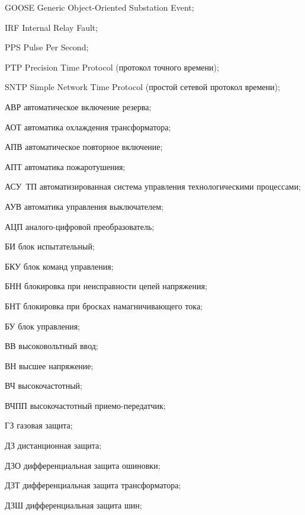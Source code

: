 \begin{list}{}%
{%
  \setlength{\labelwidth}{\abbrwidth}%
  \setlength{\labelsep}{0pt}%
  \setlength{\leftmargin}{\dimexpr\labelwidth+\labelsep\relax}%
  \setlength{\itemindent}{0pt}%
  \setlength{\parsep}{0pt}%
  \setlength{\itemsep}{0pt}
  \renewcommand{\makelabel}[1]{#1 --\hspace{\abbrgap}}%
}
\item[GOOSE] Generic Object-Oriented Substation Event;
\item[IRF] Internal Relay Fault;
\item[PPS] Pulse Per Second;
\item[PTP] Precision Time Protocol (протокол точного времени);
\item[SNTP] Simple Network Time Protocol (простой сетевой протокол времени);
\item[АВР] автоматическое включение резерва;
\item[АОТ] автоматика охлаждения трансформатора;
\item[АПВ] автоматическое повторное включение;
\item[АПТ] автоматика пожаротушения;
\item[АСУ~ТП] автоматизированная система управления технологическими процессами;
\item[АУВ] автоматика управления выключателем;
\item[АЦП] аналого-цифровой преобразователь;
\item[БИ] блок испытательный;
\item[БКУ] блок команд управления;
\item[БНН] блокировка при неисправности цепей напряжения;
\item[БНТ] блокировка при бросках намагничивающего тока;
\item[БУ] блок управления;
\item[ВВ] высоковольтный ввод;
\item[ВН] высшее напряжение;
\item[ВЧ] высокочастотный;
\item[ВЧПП] высокочастотный приемо-передатчик;
\item[ГЗ] газовая защита;
\item[ДЗ] дистанционная защита;
\item[ДЗО] дифференциальная защита ошиновки;
\item[ДЗТ] дифференциальная защита трансформатора;
\item[ДЗШ] дифференциальная защита шин;

\end{list}
